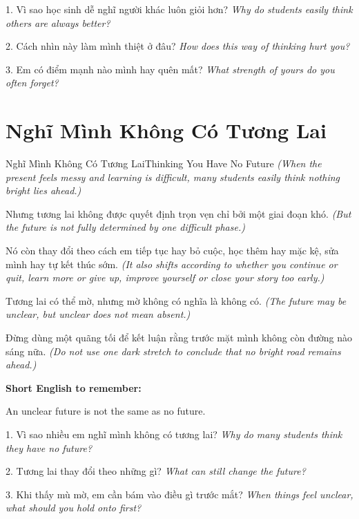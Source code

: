 \begin{tuhocnhanh}
1. Vì sao học sinh dễ nghĩ người khác luôn giỏi hơn? \textit{Why do students easily think others are always better?}

2. Cách nhìn này làm mình thiệt ở đâu? \textit{How does this way of thinking hurt you?}

3. Em có điểm mạnh nào mình hay quên mất? \textit{What strength of yours do you often forget?}
\end{tuhocnhanh}
\ngancach

\section{Nghĩ Mình Không Có Tương Lai}
\begin{truyen}{Nghĩ Mình Không Có Tương Lai}{Thinking You Have No Future}
\textit{(When the present feels messy and learning is difficult, many students easily think nothing bright lies ahead.)}

Nhưng tương lai không được quyết định trọn vẹn chỉ bởi một giai đoạn khó.
\textit{(But the future is not fully determined by one difficult phase.)}

Nó còn thay đổi theo cách em tiếp tục hay bỏ cuộc, học thêm hay mặc kệ, sửa mình hay tự kết thúc sớm.
\textit{(It also shifts according to whether you continue or quit, learn more or give up, improve yourself or close your story too early.)}

Tương lai có thể mờ, nhưng mờ không có nghĩa là không có.
\textit{(The future may be unclear, but unclear does not mean absent.)}
\end{truyen}

\begin{baihoc}
Đừng dùng một quãng tối để kết luận rằng trước mặt mình không còn đường nào sáng nữa.
\textit{(Do not use one dark stretch to conclude that no bright road remains ahead.)}
\end{baihoc}

\begin{ghinhoanh}
\textbf{Short English to remember:}

An unclear future is not the same as no future.

\end{ghinhoanh}

\begin{tuhocnhanh}
1. Vì sao nhiều em nghĩ mình không có tương lai? \textit{Why do many students think they have no future?}

2. Tương lai thay đổi theo những gì? \textit{What can still change the future?}

3. Khi thấy mù mờ, em cần bám vào điều gì trước mắt? \textit{When things feel unclear, what should you hold onto first?}
\end{tuhocnhanh}
\ngancach

